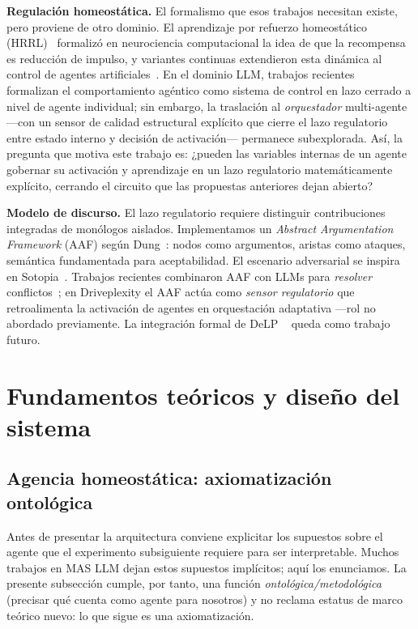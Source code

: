 \documentclass{llncs}
\begin{document}
\textbf{Regulaci\'on homeost\'atica.}
El formalismo que esos trabajos necesitan existe, pero proviene de otro
dominio. El aprendizaje por refuerzo homeost\'atico
(HRRL)~\parencite{keramati2014homeostatic} formaliz\'o en neurociencia
computacional la idea de que la recompensa es reducci\'on de impulso, y
variantes continuas extendieron esta din\'amica al control de agentes
artificiales~\parencite{laurencon2024ctcs}. En el dominio LLM, trabajos
recientes~\parencite{eslami2026controltheoretic} formalizan el
comportamiento ag\'entico como sistema de control en lazo cerrado a
nivel de agente individual; sin embargo, la traslaci\'on al
\emph{orquestador} multi-agente ---con un sensor de calidad estructural
expl\'icito que cierre el lazo regulatorio entre estado interno y
decisi\'on de activaci\'on--- permanece subexplorada. As\'i, la
pregunta que motiva este trabajo es: ¿pueden las variables internas
de un agente gobernar su activaci\'on y aprendizaje en un lazo
regulatorio matem\'aticamente expl\'icito, cerrando el circuito que
las propuestas anteriores dejan abierto?

\textbf{Modelo de discurso.}
El lazo regulatorio requiere distinguir contribuciones integradas de
mon\'ologos aislados. Implementamos un \emph{Abstract Argumentation
Framework} (AAF) seg\'un Dung~\parencite{dung1995acceptability}: nodos
como argumentos, aristas como ataques, sem\'antica fundamentada para
aceptabilidad. El escenario adversarial se inspira en
Sotopia~\parencite{zhou2024sotopia}. Trabajos recientes combinaron AAF
con LLMs para \emph{resolver} conflictos~\parencite{li2024aafconflict};
en Driveplexity el AAF act\'ua como \emph{sensor regulatorio} que
retroalimenta la activaci\'on de agentes en orquestaci\'on adaptativa
---rol no abordado previamente. La integraci\'on formal de DeLP
~\parencite{garcia2004defeasible} queda como trabajo futuro.

\section{Fundamentos te\'oricos y dise\~no del sistema}
\label{sec:method}

\subsection{Agencia homeost\'atica: axiomatizaci\'on ontol\'ogica}
\label{sec:theory}

Antes de presentar la arquitectura conviene explicitar los supuestos
sobre el agente que el experimento subsiguiente requiere para ser
interpretable. Muchos trabajos en MAS LLM dejan estos supuestos
impl\'icitos; aqu\'i los enunciamos. La presente subsecci\'on cumple,
por tanto, una funci\'on \emph{ontol\'ogica/metodol\'ogica} (precisar
qu\'e cuenta como agente para nosotros) y no reclama estatus de marco
te\'orico nuevo: lo que sigue es una axiomatizaci\'on.
\end{document}
